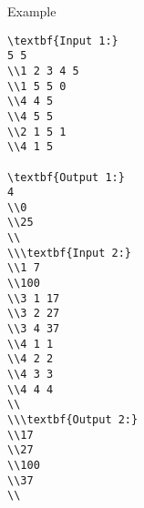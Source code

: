 Example
\begin{verbatim}
\textbf{Input 1:}
5 5 
\\1 2 3 4 5 
\\1 5 5 0 
\\4 4 5 
\\4 5 5 
\\2 1 5 1 
\\4 1 5

\textbf{Output 1:}
4
\\0
\\25 
\\
\\\textbf{Input 2:}
\\1 7 
\\100 
\\3 1 17 
\\3 2 27 
\\3 4 37 
\\4 1 1 
\\4 2 2 
\\4 3 3 
\\4 4 4
\\
\\\textbf{Output 2:}
\\17 
\\27 
\\100
\\37
\\\end{verbatim}